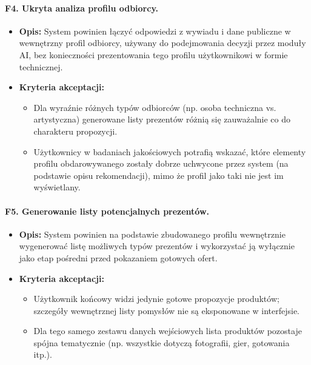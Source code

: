 \documentclass[12pt,a4paper]{article}
\begin{document}
\paragraph{F4. Ukryta analiza profilu odbiorcy.}
\begin{itemize}
    \item \textbf{Opis:} System powinien łączyć odpowiedzi z wywiadu i dane publiczne w wewnętrzny profil odbiorcy, używany do podejmowania decyzji przez moduły AI, bez konieczności prezentowania tego profilu użytkownikowi w formie technicznej.
    \item \textbf{Kryteria akceptacji:}
    \begin{itemize}
        \item Dla wyraźnie różnych typów odbiorców (np. osoba techniczna vs. artystyczna) generowane listy prezentów różnią się zauważalnie co do charakteru propozycji.
        \item Użytkownicy w badaniach jakościowych potrafią wskazać, które elementy profilu obdarowywanego zostały dobrze uchwycone przez system (na podstawie opisu rekomendacji), mimo że profil jako taki nie jest im wyświetlany.
    \end{itemize}
\end{itemize}

\paragraph{F5. Generowanie listy potencjalnych prezentów.}
\begin{itemize}
    \item \textbf{Opis:} System powinien na podstawie zbudowanego profilu wewnętrznie wygenerować listę możliwych typów prezentów i wykorzystać ją wyłącznie jako etap pośredni przed pokazaniem gotowych ofert.
    \item \textbf{Kryteria akceptacji:}
    \begin{itemize}
        \item Użytkownik końcowy widzi jedynie gotowe propozycje produktów; szczegóły wewnętrznej listy pomysłów nie są eksponowane w interfejsie.
        \item Dla tego samego zestawu danych wejściowych lista produktów pozostaje spójna tematycznie (np. wszystkie dotyczą fotografii, gier, gotowania itp.).
    \end{itemize}
\end{itemize}
\end{document}
